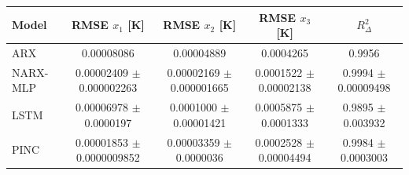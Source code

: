 \begin{tabular}{lcccc}
\toprule
Model & RMSE $x_1$ [K] & RMSE $x_2$ [K] & RMSE $x_3$ [K] & $R^2_\Delta$ \\
\midrule
ARX & 0.00008086 & 0.00004889 & 0.0004265 & 0.9956 \\
NARX-MLP & 0.00002409 $\pm$ 0.000002263 & 0.00002169 $\pm$ 0.000001665 & 0.0001522 $\pm$ 0.00002138 & 0.9994 $\pm$ 0.00009498 \\
LSTM & 0.00006978 $\pm$ 0.0000197 & 0.0001000 $\pm$ 0.00001421 & 0.0005875 $\pm$ 0.0001333 & 0.9895 $\pm$ 0.003932 \\
PINC & 0.00001853 $\pm$ 0.0000009852 & 0.00003359 $\pm$ 0.0000036 & 0.0002528 $\pm$ 0.00004494 & 0.9984 $\pm$ 0.0003003 \\
\bottomrule
\end{tabular}
